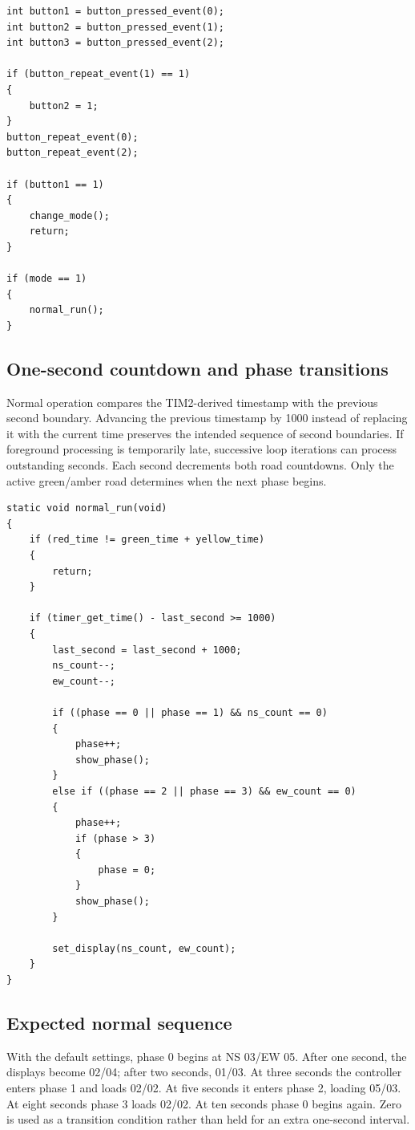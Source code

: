 \documentclass[a4paper]{article}
\newcommand{\topic}[1]{\subsection{#1}}
\begin{document}
\par\noindent\begin{minipage}{\linewidth}
\begin{lstlisting}[caption={Core event dispatch at the start of the FSM}]
int button1 = button_pressed_event(0);
int button2 = button_pressed_event(1);
int button3 = button_pressed_event(2);

if (button_repeat_event(1) == 1)
{
    button2 = 1;
}
button_repeat_event(0);
button_repeat_event(2);

if (button1 == 1)
{
    change_mode();
    return;
}

if (mode == 1)
{
    normal_run();
}
\end{lstlisting}
\end{minipage}\par

\topic{One-second countdown and phase transitions}
Normal operation compares the TIM2-derived timestamp with the previous
second boundary. Advancing the previous timestamp by 1000 instead of replacing
it with the current time preserves the intended sequence of second boundaries.
If foreground processing is temporarily late, successive loop iterations can
process outstanding seconds. Each second decrements both road countdowns.
Only the active green/amber road determines when the next phase begins.

\begin{lstlisting}[caption={Normal operation and countdown transitions}]
static void normal_run(void)
{
    if (red_time != green_time + yellow_time)
    {
        return;
    }

    if (timer_get_time() - last_second >= 1000)
    {
        last_second = last_second + 1000;
        ns_count--;
        ew_count--;

        if ((phase == 0 || phase == 1) && ns_count == 0)
        {
            phase++;
            show_phase();
        }
        else if ((phase == 2 || phase == 3) && ew_count == 0)
        {
            phase++;
            if (phase > 3)
            {
                phase = 0;
            }
            show_phase();
        }

        set_display(ns_count, ew_count);
    }
}
\end{lstlisting}

\topic{Expected normal sequence}
With the default settings, phase 0 begins at NS 03/EW 05. After one second,
the displays become 02/04; after two seconds, 01/03. At three seconds the
controller enters phase 1 and loads 02/02. At five seconds it enters phase 2,
loading 05/03. At eight seconds phase 3 loads 02/02. At ten seconds phase 0
begins again. Zero is used as a transition condition rather than held for an
extra one-second interval.
\end{document}
